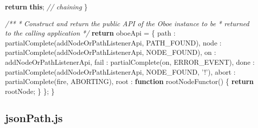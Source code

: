 \documentclass[]{article}
\newenvironment{Shaded}{}{}
\newcommand{\KeywordTok}[1]{\textcolor[rgb]{0.00,0.44,0.13}{\textbf{{#1}}}}
\newcommand{\DataTypeTok}[1]{\textcolor[rgb]{0.56,0.13,0.00}{{#1}}}
\newcommand{\StringTok}[1]{\textcolor[rgb]{0.25,0.44,0.63}{{#1}}}
\newcommand{\CommentTok}[1]{\textcolor[rgb]{0.38,0.63,0.69}{\textit{{#1}}}}
\newcommand{\FunctionTok}[1]{\textcolor[rgb]{0.02,0.16,0.49}{{#1}}}
\newcommand{\NormalTok}[1]{{#1}}
\begin{document}
\begin{Shaded}
\begin{Highlighting}[]
      \KeywordTok{return} \KeywordTok{this}\NormalTok{; }\CommentTok{// chaining}
   \NormalTok{\}}

   \CommentTok{/**}
\CommentTok{    * Construct and return the public API of the Oboe instance to be }
\CommentTok{    * returned to the calling application}
\CommentTok{    */}
   \KeywordTok{return} \NormalTok{oboeApi = \{ }
      \DataTypeTok{path  }\NormalTok{:  }\FunctionTok{partialComplete}\NormalTok{(addNodeOrPathListenerApi, PATH_FOUND), }
      \DataTypeTok{node  }\NormalTok{:  }\FunctionTok{partialComplete}\NormalTok{(addNodeOrPathListenerApi, NODE_FOUND),}
      \DataTypeTok{on    }\NormalTok{:  addNodeOrPathListenerApi,}
      \DataTypeTok{fail  }\NormalTok{:  }\FunctionTok{partialComplete}\NormalTok{(on, ERROR_EVENT),}
      \DataTypeTok{done  }\NormalTok{:  }\FunctionTok{partialComplete}\NormalTok{(addNodeOrPathListenerApi, NODE_FOUND, }\StringTok{'!'}\NormalTok{),}
      \DataTypeTok{abort }\NormalTok{:  }\FunctionTok{partialComplete}\NormalTok{(fire, ABORTING),}
      \DataTypeTok{root  }\NormalTok{:  }\KeywordTok{function} \FunctionTok{rootNodeFunctor}\NormalTok{() \{}
                  \KeywordTok{return} \NormalTok{rootNode;}
               \NormalTok{\}}
   \NormalTok{\};}
\NormalTok{\}}
\end{Highlighting}
\end{Shaded}

\pagebreak

\subsection{jsonPath.js}
\end{document}

